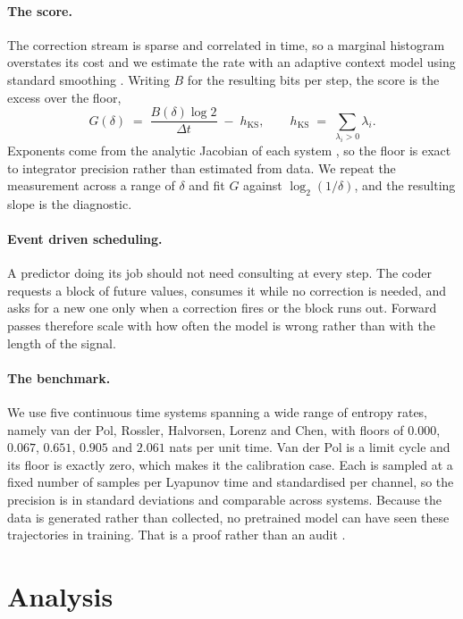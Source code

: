 \documentclass{article}
\begin{document}
\paragraph{The score.}
The correction stream is sparse and correlated in time, so a marginal histogram overstates its cost and we estimate the rate with an adaptive context model using standard smoothing \citep{krichevsky1981}. Writing $B$ for the resulting bits per step, the score is the excess over the floor,
\begin{equation}
G(\delta) \;=\; \frac{B(\delta) \log 2}{\Delta t} \;-\; h_{\mathrm{KS}},
\qquad
h_{\mathrm{KS}} \;=\; \sum_{\lambda_i > 0} \lambda_i .
\end{equation}
Exponents come from the analytic Jacobian of each system \citep{benettin1980, wolf1985}, so the floor is exact to integrator precision rather than estimated from data. We repeat the measurement across a range of $\delta$ and fit $G$ against $\log_2(1/\delta)$, and the resulting slope is the diagnostic.

\paragraph{Event driven scheduling.}
A predictor doing its job should not need consulting at every step. The coder requests a block of future values, consumes it while no correction is needed, and asks for a new one only when a correction fires or the block runs out. Forward passes therefore scale with how often the model is wrong rather than with the length of the signal.

\paragraph{The benchmark.}
We use five continuous time systems spanning a wide range of entropy rates, namely van der Pol, Rossler, Halvorsen, Lorenz and Chen, with floors of $0.000$, $0.067$, $0.651$, $0.905$ and $2.061$ nats per unit time. Van der Pol is a limit cycle and its floor is exactly zero, which makes it the calibration case. Each is sampled at a fixed number of samples per Lyapunov time and standardised per channel, so the precision is in standard deviations and comparable across systems. Because the data is generated rather than collected, no pretrained model can have seen these trajectories in training. That is a proof rather than an audit \citep{sainz2023contamination, carlini2023memorization}.

\section{Analysis}
\label{sec:analysis}
\end{document}

